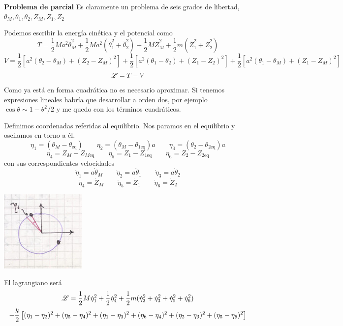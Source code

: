 \documentclass[10pt,oneside]{CBFT_book}
\begin{document}
\begin{ejemplo}{\bf Problema de parcial}
Es claramente un problema de seis grados de libertad, $\theta_M, \theta_1, \theta_2, Z_M, Z_1, Z_2$ 

Podemos escribir la energía cinética y el potencial como 
\[
	T = \frac{1}{2} M a^2 \dot{\theta}_M^2 + \frac{1}{2} M a^2 (\dot{\theta}_1^2 + \dot{\theta}_2^2 ) +
	\frac{1}{2} M \dot{Z}_M^2 + \frac{1}{2} m ( \dot{Z}_1^2 + \dot{Z}_2^2 )
\]
\[
	V = \frac{1}{2} \left[ a^2 ( \theta_2 - \theta_M ) + ( Z_2 - Z_M )^2 \right] +
	\frac{1}{2} \left[  a^2 ( \theta_1 - \theta_2 ) + ( Z_1 - Z_2 )^2 \right] +
	\frac{1}{2} \left[ a^2 ( \theta_1 - \theta_M ) + ( Z_1- Z_M )^2 \right] 
\]
\[
	\mathscr{L} = T - V
\]
Como ya está en forma cuadrática no es necesario aproximar. Si tenemos expresiones lineales habría que desarrollar
a orden dos, por ejemplo $ \cos \theta \sim 1 - \theta^2/2 $ y me quedo con los términos cuadráticos.

Definimos coordenadas referidas al equilibrio. Nos paramos en el equilibrio y oscilamos en torno a él.
\[
 	\eta_1 = ( \theta_M - \theta_{\mbox{eq}} ) 
 	\qquad 
 	\eta_2 = ( \theta_M - \theta_{ 1 \mbox{eq} } )a 
 	\qquad 
 	\eta_3 = ( \theta_2 - \theta_{ 2 \mbox{eq} } )a
\]
\[
	\eta_4 = Z_M - Z_{M\mbox{eq}} \qquad \eta_5 = Z_1 - Z_{1\mbox{eq}} \qquad \eta_6 = Z_2 - Z_{2\mbox{eq}}
\]
con sus correspondientes velocidades
\[
	\dot{\eta}_1 = a \dot{\theta}_M \qquad \dot{\eta}_2 = a \dot{\theta}_1 \qquad \dot{\eta}_3 = a \dot{\theta}_2
\]
\[
	\dot{\eta}_4 = \dot{Z}_M \qquad \dot{\eta}_5 = \dot{Z}_1 \qquad \dot{\eta}_6 = \dot{Z}_2
\]

\includegraphics[scale=0.5]{images/fig_mc_problema_parcial_osc_3.jpg}

El lagrangiano será 
\begin{multline*}
	\mathscr{L}  =  \frac{1}{2} M \dot{\eta}_1^2 + \frac{1}{2}\dot{\eta}_4^2 + \frac{1}{2} m (\dot{\eta}_2^2 + \dot{\eta}_3^2 + \dot{\eta}_5^2 + \dot{\eta}_6^2 ) \\
	- \frac{k}{2}\left[ (\eta_1 - \eta_2 )^2 + (\eta_5 - \eta_4 )^2 + (\eta_1 - \eta_3 )^2 + (\eta_6 - \eta_4 )^2 + (\eta_2 - \eta_3 )^2 + (\eta_5 - \eta_6 )^2 \right]
\end{multline*}



\end{ejemplo}
\end{document}
